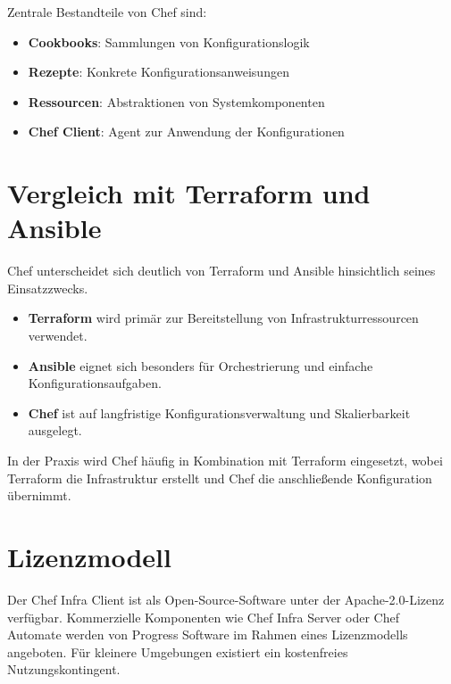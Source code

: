 \documentclass[BMR,Seminar,ngerman,IEEE]{twbook}
\begin{document}
Zentrale Bestandteile von Chef sind:
\begin{itemize}
  \item \textbf{Cookbooks}: Sammlungen von Konfigurationslogik
  \item \textbf{Rezepte}: Konkrete Konfigurationsanweisungen
  \item \textbf{Ressourcen}: Abstraktionen von Systemkomponenten
  \item \textbf{Chef Client}: Agent zur Anwendung der Konfigurationen
\end{itemize}

\section{Vergleich mit Terraform und Ansible}
Chef unterscheidet sich deutlich von Terraform und Ansible hinsichtlich seines Einsatzzwecks.

\begin{itemize}
  \item \textbf{Terraform} wird primär zur Bereitstellung von Infrastrukturressourcen verwendet.
  \item \textbf{Ansible} eignet sich besonders für Orchestrierung und einfache Konfigurationsaufgaben.
  \item \textbf{Chef} ist auf langfristige Konfigurationsverwaltung und Skalierbarkeit ausgelegt.
\end{itemize}

In der Praxis wird Chef häufig in Kombination mit Terraform eingesetzt, wobei Terraform die Infrastruktur erstellt und Chef die anschließende Konfiguration übernimmt.

\section{Lizenzmodell}
Der Chef Infra Client ist als Open-Source-Software unter der Apache-2.0-Lizenz verfügbar.
Kommerzielle Komponenten wie Chef Infra Server oder Chef Automate werden von Progress Software im Rahmen eines Lizenzmodells angeboten.
Für kleinere Umgebungen existiert ein kostenfreies Nutzungskontingent.

\end{document}
